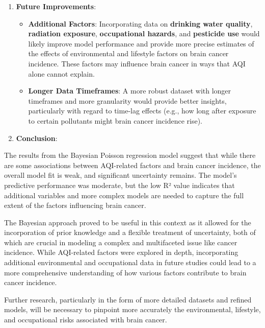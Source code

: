 \documentclass[
  12pt,
]{article}
\begin{document}
\begin{enumerate}
\def\labelenumi{\arabic{enumi}.}
\setcounter{enumi}{2}
\item
  \textbf{Future Improvements}:

  \begin{itemize}
  \item
    \textbf{Additional Factors}: Incorporating data on \textbf{drinking
    water quality}, \textbf{radiation exposure}, \textbf{occupational
    hazards}, and \textbf{pesticide use} would likely improve model
    performance and provide more precise estimates of the effects of
    environmental and lifestyle factors on brain cancer incidence. These
    factors may influence brain cancer in ways that AQI alone cannot
    explain.
  \item
    \textbf{Longer Data Timeframes}: A more robust dataset with longer
    timeframes and more granularity would provide better insights,
    particularly with regard to time-lag effects (e.g., how long after
    exposure to certain pollutants might brain cancer incidence rise).
  \end{itemize}
\item
  \textbf{Conclusion}:
\end{enumerate}

The results from the Bayesian Poisson regression model suggest that
while there are some associations between AQI-related factors and brain
cancer incidence, the overall model fit is weak, and significant
uncertainty remains. The model's predictive performance was moderate,
but the low R² value indicates that additional variables and more
complex models are needed to capture the full extent of the factors
influencing brain cancer.

The Bayesian approach proved to be useful in this context as it allowed
for the incorporation of prior knowledge and a flexible treatment of
uncertainty, both of which are crucial in modeling a complex and
multifaceted issue like cancer incidence. While AQI-related factors were
explored in depth, incorporating additional environmental and
occupational data in future studies could lead to a more comprehensive
understanding of how various factors contribute to brain cancer
incidence.

Further research, particularly in the form of more detailed datasets and
refined models, will be necessary to pinpoint more accurately the
environmental, lifestyle, and occupational risks associated with brain
cancer.
\end{document}
